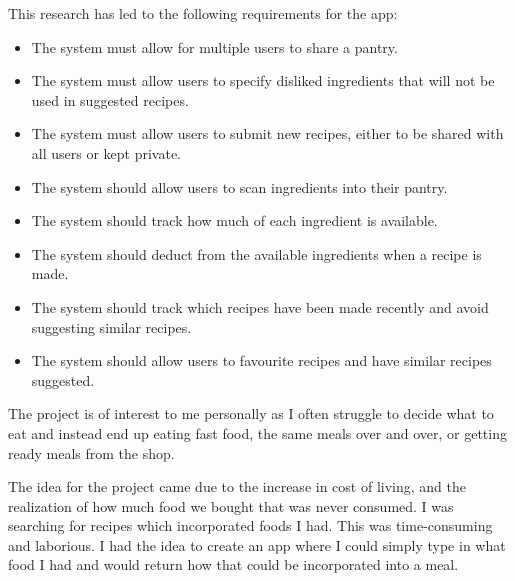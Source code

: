 \documentclass[../CHEFCookingHelperForEveryonesFridge.tex]{subfiles}
\begin{document}
This research has led to the following requirements for the \chef{} app:
\begin{itemize}
    \item The system must allow for multiple users to share a pantry.
    \item The system must allow users to specify disliked ingredients that will not be used in suggested recipes.
    \item The system must allow users to submit new recipes, either to be shared with all users or kept private.
    \item The system should allow users to scan ingredients into their pantry.
    \item The system should track how much of each ingredient is available.
    \item The system should deduct from the available ingredients when a recipe is made.
    \item The system should track which recipes have been made recently and avoid suggesting similar recipes.
    \item The system should allow users to favourite recipes and have similar recipes suggested.
\end{itemize}
The project is of interest to me personally as I often struggle to decide what to eat and instead end up eating fast food,
the same meals over and over, or getting ready meals from the shop.

The idea for the project came due to the increase in cost of living, and the realization of how much food we bought that was
never consumed. I was searching for recipes which incorporated foods I had. This was time-consuming and laborious.
I had the idea to create an app where I could simply type in what food I had and would return how that could be incorporated
into a meal.

\end{document}
